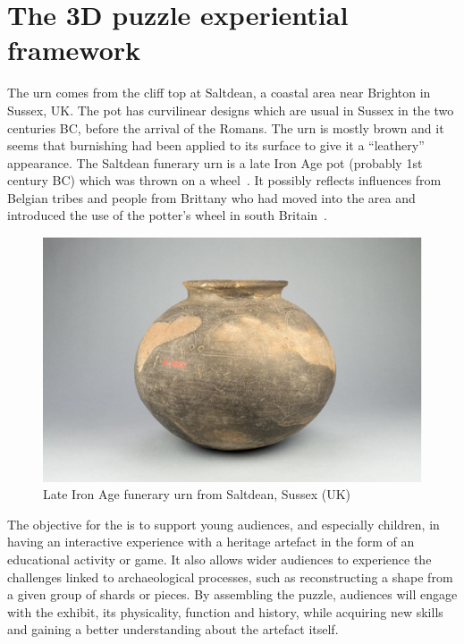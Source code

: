 \documentclass[acmlarge,screen,dvipsnames]{acmart}
\begin{document}
\section{The 3D puzzle experiential framework}
\label{requirements}
 The urn comes
from the cliff top at Saltdean, a coastal area near Brighton in
Sussex, UK. The pot has curvilinear designs which are usual in Sussex
in the two centuries BC, before the arrival of the Romans. The urn is
mostly brown and it seems that burnishing had been applied to its
surface to give it a ``leathery'' appearance. The Saltdean funerary
urn is a late Iron Age pot (probably 1st century BC) which was thrown
on a wheel~\cite{Toms1912}. It possibly reflects influences from
Belgian tribes and people from Brittany who had moved into the area
and introduced the use of the potter's wheel in south
Britain~\cite{Harding1974,Cunliffe1978,Adkins1982,Cunliffe1995}.
%
\begin{figure}[H]
  \centering
  \includegraphics[width=0.6\linewidth]{images/pot}
  \caption{\label{fig:pot}
    Late Iron Age funerary urn from Saltdean, Sussex (UK)}
\end{figure}

 The objective for the  is to support young
audiences, and especially children, in having an interactive
experience with a heritage artefact in the form of an educational
activity or game. It \KRedit[will] also allows wider audiences to experience the
challenges linked to archaeological processes, such as reconstructing
a shape from a given group of shards or pieces. By assembling the
puzzle, audiences will engage with the exhibit, its physicality,
function and history, while acquiring new skills and gaining a better
understanding about the artefact itself.
\end{document}
